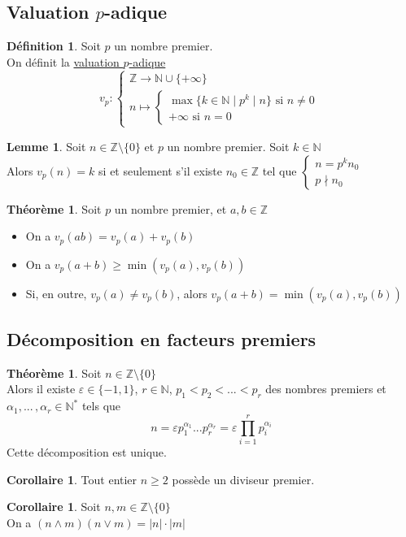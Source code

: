 \documentclass[10pt,a4paper]{article}
\theoremstyle{definition}
\newtheorem{theorem}[proposition]{Théorème}
\newtheorem{corollaire}[proposition]{Corollaire}
\newtheorem{lemme}[proposition]{Lemme}
\newtheorem{definition}[proposition]{Définition}
\begin{document}
\subsection{Valuation $p$-adique}
\begin{definition}
Soit $p$ un nombre premier. \\
On définit la \uline{valuation $p$-adique}
\[ v_p: \begin{cases}
\mathbb{Z} \to \mathbb{N} \cup \{ +\infty \} \\
n \mapsto \begin{cases}
\max \{ k \in \mathbb{N} \mid p^k \mid n \} \text{ si } n \neq 0 \\
+\infty \text{ si } n = 0
\end{cases}
\end{cases}\]
\end{definition}
\begin{lemme}
Soit $n \in \mathbb{Z} \setminus \{ 0 \}$ et $p$ un nombre premier. Soit $k \in \mathbb{N}$ \\
Alors $v_p(n) = k$ si et seulement s'il existe $n_0 \in \mathbb{Z}$ tel que $\begin{cases}
n = p^k n_0 \\
p \nmid n_0
\end{cases}$
\end{lemme}
\begin{theorem}
Soit $p$ un nombre premier, et $a, b \in \mathbb{Z}$
\begin{itemize}
\item On a $v_p(ab) = v_p(a) + v_p(b)$
\item On a $v_p(a + b) \geq \min(v_p(a), v_p(b))$
\item Si, en outre, $v_p(a) \neq v_p(b)$, alors $v_p(a + b) = \min(v_p(a), v_p(b))$
\end{itemize}
\end{theorem}

\subsection{Décomposition en facteurs premiers}
\begin{theorem}
Soit $n \in \mathbb{Z} \setminus \{ 0 \}$ \\
Alors il existe $\varepsilon \in \{ -1, 1 \}$, $r \in \mathbb{N}$, $p_1 < p_2 < ... < p_r$ des nombres premiers et $\alpha_1, ...\,, \alpha_r \in \mathbb{N}^*$ tels que
\[n = \varepsilon p_1^{\alpha_1} ... p_r^{\alpha_r} = \varepsilon \prod_{i = 1}^r p_i^{\alpha_i}\]
Cette décomposition est unique.
\end{theorem}
\begin{corollaire}
Tout entier $n \geq 2$ possède un diviseur premier.
\end{corollaire}
\begin{corollaire}
Soit $n, m \in \mathbb{Z} \setminus \{ 0 \}$ \\
On a $(n \wedge m)(n \vee m) = |n| \cdot |m|$
\end{corollaire}
\end{document}
